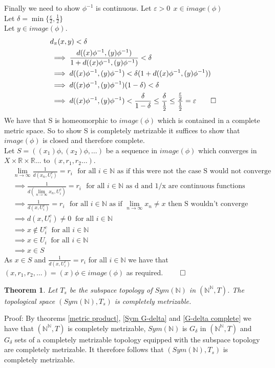\documentclass{report}
\newtheorem{theorem}{Theorem}[section]
\begin{document}
Finally we need to show $\phi^{-1}$ is continuous.
Let $\varepsilon>0\ \ x\in image(\phi)$\\
Let $\delta = \min \{\frac{\varepsilon}{2},\frac{1}{2}\}$\\
Let $y \in image (\phi)$.
\begin{align*}
&d_\pi (x,y) < \delta\\
&\implies \frac{d((x)\phi^{-1},(y)\phi^{-1})}{1+d((x)\phi^{-1},(y)\phi^{-1})}<\delta\\
&\implies d((x)\phi^{-1},(y)\phi^{-1})<\delta (1+d((x)\phi^{-1},(y)\phi^{-1}))\\
&\implies d((x)\phi^{-1},(y)\phi^{-1})(1-\delta)<\delta\\
&\implies d((x)\phi^{-1},(y)\phi^{-1})<\frac{\delta}{1-\delta}\leq \frac{\delta}{\frac{1}{2}}\leq\frac{\frac{\varepsilon}{2}}{\frac{1}{2}}= \varepsilon\qed
\end{align*}
We have that S is homeomorphic to $image(\phi)$ which is contained in a complete metric space. So to show S is completely metrizable it suffices to show that $image(\phi)$ is closed and therefore complete.\\
Let $S = ((x_1)\phi,(x_2)\phi, \ldots )$ be a sequence in $image(\phi)$ which converges in $X \times
\mathbb{R} \times \mathbb{R} \ldots $ to $(x,r_1,r_2 \ldots)$.\\
\begin{align*}
&\lim_{n\rightarrow \infty}{\frac{1}{d(x_n,U_i^c)}=r_i}\ \ \ \text{for all } i \in \mathbb{N} \text{  as if this were not the case S would not converge}\\
&\implies {\frac{1}{d( \lim_{n\rightarrow \infty}x_n,U_i^c)}=r_i}\ \ \ \text{for all } i \in \mathbb{N}\text{  as d and 1/x are continuous functions}\\
&\implies \frac{1}{d(x,U_i^c)}=r_i\ \ \ \text{for all } i \in \mathbb{N}\text{  as if }\lim_{n\rightarrow\infty}{x_n}\neq x \text{ then S wouldn't converge}\\
&\implies d(x,U_i^c) \neq 0\ \text{ for all } i \in \mathbb{N}\\
&\implies x \notin U_i^c\ \text{  for all } i \in \mathbb{N}\\
&\implies x \in U_i\ \text{  for all } i \in \mathbb{N}\\
&\implies x \in S
\end{align*}
As $x \in S$ and ${\frac{1}{d(x,U_i^c)}=r_i}$   for all $i \in \mathbb{N}$ we have that $(x,r_1,r_2,\ldots ) = (x)\phi \in image(\phi)$ as required. $\qed$
\begin{theorem}
Let $T_s$ be the subspace topology of $Sym(\mathbb{N})$ in $(\mathbb{N}^\mathbb{N},T)$. The topological space $(Sym(\mathbb{N}),T_s)$ is completely metrizable.
\end{theorem}\par
Proof: By theorems \ref{metric product}, \ref{Sym G-delta} and \ref{G-delta complete} we have that $(\mathbb{N}^\mathbb{N},T)$ is completely metrizable, $Sym(\mathbb{N})$ is $G_\delta$ in $(\mathbb{N}^\mathbb{N},T)$ and $G_\delta$ sets of a completely metrizable topology equipped with the subspace topology are completely metrizable. It therefore follows that $(Sym(\mathbb{N}),T_s)$ is completely metrizable.
\end{document}
